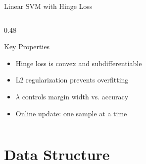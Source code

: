 \documentclass[aspectratio=169, 10pt]{beamer}
\begin{document}
\begin{frame}{Linear SVM with Hinge Loss}
\begin{columns}[T]
\begin{column}{0.48\textwidth}
\vspace{0.3em}
\begin{block}{Key Properties}
\begin{itemize}
  \item Hinge loss is convex and subdifferentiable
  \item L2 regularization prevents overfitting
  \item $\lambda$ controls margin width vs. accuracy
  \item Online update: one sample at a time
\end{itemize}
\end{block}
\end{column}
\end{columns}
\end{frame}

\section{Data Structure}
\end{document}
